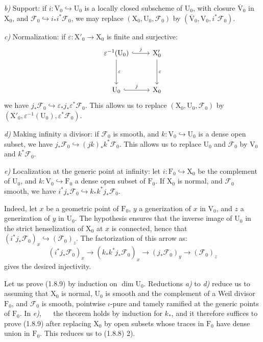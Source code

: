 \documentclass[11pt,leqno]{article}
\newcommand{\Page}[1]{\ifvmode\noindent\else\unskip\ \fi{\footnotesize\textcolor{gray}{[p.\,#1]}}\ \ignorespaces}
\begin{document}
\textit{b)} Support: if \(i:\mathrm{V}_0\hookrightarrow\mathrm{U}_0\) is a locally closed subscheme of \(\mathrm{U}_0\), with closure \(\overline{\mathrm{V}}_0\) in \(\mathrm{X}_0\), and \(\mathscr{F}_0\hookrightarrow i_*i^*\mathscr{F}_0\), we may replace \((\mathrm{X}_0,\mathrm{U}_0,\mathscr{F}_0)\) by \((\overline{\mathrm{V}}_0,\mathrm{V}_0,i^*\mathscr{F}_0)\).

\textit{c)} Normalization: if \(\varepsilon:\mathrm{X}'_0\to\mathrm{X}_0\) is finite and surjective:
\[
\begin{tikzcd}[column sep=2.5em,row sep=3.5em]
\varepsilon^{-1}(\mathrm{U}_0)
  \arrow[r,hook,"j"] \arrow[d,"\varepsilon"]
  & \mathrm{X}'_0 \arrow[d,"\varepsilon"] \\
\mathrm{U}_0 \arrow[r,hook,"j"]
  & \mathrm{X}_0
\end{tikzcd}
\]
we have \(j_*\mathscr{F}_0\hookrightarrow\varepsilon_*j_*\varepsilon^*\mathscr{F}_0\). This allows us to replace \((\mathrm{X}_0,\mathrm{U}_0,\mathscr{F}_0)\) by \((\mathrm{X}'_0,\varepsilon^{-1}(\mathrm{U}_0),\varepsilon^*\mathscr{F}_0)\).

\textit{d)} Making infinity a divisor: if \(\mathscr{F}_0\) is smooth, and \(k:\mathrm{V}_0\hookrightarrow\mathrm{U}_0\) is a dense open subset, we have \(j_*\mathscr{F}_0\hookrightarrow(jk)_*k^*\mathscr{F}_0\). This allows us to replace \(\mathrm{U}_0\) and \(\mathscr{F}_0\) by \(\mathrm{V}_0\) and \(k^*\mathscr{F}_0\).

\textit{e)} Localization at the generic point at infinity: let \(i:\mathrm{F}_0\hookrightarrow\mathrm{X}_0\) be the complement of \(\mathrm{U}_0\), and \(k:\mathrm{V}_0\hookrightarrow\mathrm{F}_0\) a dense open subset of \(\mathrm{F}_0\). If \(\mathrm{X}_0\) is normal, and \(\mathscr{F}_0\) smooth, we have \(i^*j_*\mathscr{F}_0\hookrightarrow k_*k^*j_*\mathscr{F}_0\).

Indeed, let \(x\) be a geometric point of \(\mathrm{F}_0\), \(y\) a generization of \(x\) in \(\mathrm{V}_0\), and \(z\) a generization of \(y\) in \(\mathrm{U}_0\). The hypothesis ensures that the inverse image of \(\mathrm{U}_0\) in the strict henselization of \(\mathrm{X}_0\) at \(x\) is connected, hence that \((i^*j_*\mathscr{F}_0)_x\hookrightarrow(\mathscr{F}_0)_z\). The factorization of this arrow as:
\[
(i^*j_*\mathscr{F}_0)_x
\to(k_*k^*j_*\mathscr{F}_0)_x
\to(j_*\mathscr{F}_0)_y
\to(\mathscr{F}_0)_z
\]
gives the desired injectivity.

Let us prove (1.8.9) by induction on \(\dim\mathrm{U}_0\). Reductions \textit{a)} to \textit{d)} reduce us to assuming that \(\mathrm{X}_0\) is normal, \(\mathrm{U}_0\) is smooth and the complement of a Weil divisor \(\mathrm{F}_0\), and \(\mathscr{F}_0\) is smooth, pointwise \(\iota\)-pure and tamely ramified at the generic points of \(\mathrm{F}_0\). In \textit{e)},
\Page{178}
the theorem holds by induction for \(k_*\), and it therefore suffices to prove (1.8.9) after replacing \(\mathrm{X}_0\) by open subsets whose traces in \(\mathrm{F}_0\) have dense union in \(\mathrm{F}_0\). This reduces us to (1.8.8) 2).
\end{document}
